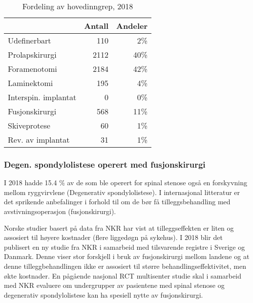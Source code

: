 \documentclass [norsk,a4paper,twoside]{article}\usepackage[]{graphicx}\usepackage[]{color}
\begin{document}
\begin{table}[ht]
\centering
\begin{tabular}{lrr}
  \hline
 & Antall & Andeler \\ 
  \hline
Udefinerbart & 110 & 2\% \\ 
  Prolapskirurgi & 2112 & 40\% \\ 
  Foramenotomi & 2184 & 42\% \\ 
  Laminektomi & 195 & 4\% \\ 
  Interspin. implantat & 0 & 0\% \\ 
  Fusjonskirurgi & 568 & 11\% \\ 
  Skiveprotese & 60 & 1\% \\ 
  Rev. av implantat & 31 & 1\% \\ 
   \hline
\end{tabular}
\caption{Fordeling av hovedinngrep, 2018} 
\label{tab:AntHovedInngrep}
\end{table}






\subsubsection{Degen. spondylolistese operert med fusjonskirurgi}


I 2018 hadde 15.4 \% av de som ble operert for spinal stenose  også en 
forskyvning mellom ryggvirvlene (Degenerativ spondylolistese). I internasjonal litteratur er det sprikende
 anbefalinger i forhold til om de bør få tilleggsbehandling med avstivningsoperasjon (fusjonskirurgi).
 

Norske studier basert på data fra NKR har vist at tilleggseffekten er liten og assosiert til høyere kostnader (flere liggedøgn på sykehus). 
I 2018 blir det publisert en ny studie fra NKR i samarbeid med  tilsvarende registre i Sverige og Danmark. Denne viser stor forskjell i bruk av fusjonskirurgi mellom landene og at denne tilleggbehandlingen ikke er assosiert til større behandlingseffektivitet, men økte kostnader. En pågående nasjonal RCT multisenter studie skal i samarbeid med NKR evaluere om undergrupper av pasientene med spinal stenose og degenerativ spondylolistese kan ha spesiell nytte av fusjonskirurgi.
\clearpage
\end{document}
